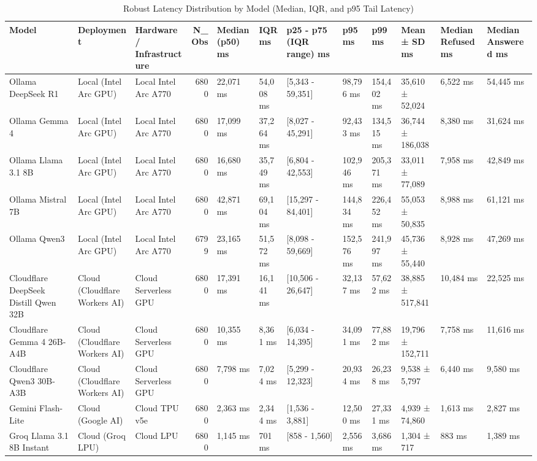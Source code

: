 \begin{table}[t]
\centering
\caption{Robust Latency Distribution by Model (Median, IQR, and p95 Tail Latency)}
\begin{tabular}{lllrllllllll}
\toprule
Model & Deployment & Hardware / Infrastructure & N\_Obs & Median (p50) ms & IQR ms & p25 - p75 (IQR range) ms & p95 ms & p99 ms & Mean ± SD ms & Median Refused ms & Median Answered ms \\
\midrule
Ollama DeepSeek R1 & Local (Intel Arc GPU) & Local Intel Arc A770 & 6800 & 22,071 ms & 54,008 ms & [5,343 - 59,351] & 98,796 ms & 154,402 ms & 35,610 ± 52,024 & 6,522 ms & 54,445 ms \\
Ollama Gemma 4 & Local (Intel Arc GPU) & Local Intel Arc A770 & 6800 & 17,099 ms & 37,264 ms & [8,027 - 45,291] & 92,433 ms & 134,515 ms & 36,744 ± 186,038 & 8,380 ms & 31,624 ms \\
Ollama Llama 3.1 8B & Local (Intel Arc GPU) & Local Intel Arc A770 & 6800 & 16,680 ms & 35,749 ms & [6,804 - 42,553] & 102,946 ms & 205,371 ms & 33,011 ± 77,089 & 7,958 ms & 42,849 ms \\
Ollama Mistral 7B & Local (Intel Arc GPU) & Local Intel Arc A770 & 6800 & 42,871 ms & 69,104 ms & [15,297 - 84,401] & 144,834 ms & 226,452 ms & 55,053 ± 50,835 & 8,988 ms & 61,121 ms \\
Ollama Qwen3 & Local (Intel Arc GPU) & Local Intel Arc A770 & 6799 & 23,165 ms & 51,572 ms & [8,098 - 59,669] & 152,576 ms & 241,997 ms & 45,736 ± 55,440 & 8,928 ms & 47,269 ms \\
Cloudflare DeepSeek Distill Qwen 32B & Cloud (Cloudflare Workers AI) & Cloud Serverless GPU & 6800 & 17,391 ms & 16,141 ms & [10,506 - 26,647] & 32,137 ms & 57,622 ms & 38,885 ± 517,841 & 10,484 ms & 22,525 ms \\
Cloudflare Gemma 4 26B-A4B & Cloud (Cloudflare Workers AI) & Cloud Serverless GPU & 6800 & 10,355 ms & 8,361 ms & [6,034 - 14,395] & 34,091 ms & 77,882 ms & 19,796 ± 152,711 & 7,758 ms & 11,616 ms \\
Cloudflare Qwen3 30B-A3B & Cloud (Cloudflare Workers AI) & Cloud Serverless GPU & 6800 & 7,798 ms & 7,024 ms & [5,299 - 12,323] & 20,934 ms & 26,238 ms & 9,538 ± 5,797 & 6,440 ms & 9,580 ms \\
Gemini Flash-Lite & Cloud (Google AI) & Cloud TPU v5e & 6800 & 2,363 ms & 2,344 ms & [1,536 - 3,881] & 12,500 ms & 27,331 ms & 4,939 ± 74,860 & 1,613 ms & 2,827 ms \\
Groq Llama 3.1 8B Instant & Cloud (Groq LPU) & Cloud LPU & 6800 & 1,145 ms & 701 ms & [858 - 1,560] & 2,556 ms & 3,686 ms & 1,304 ± 717 & 883 ms & 1,389 ms \\

\end{tabular}
\end{table}
